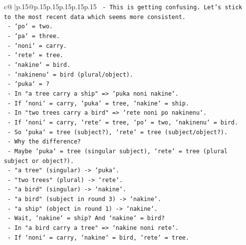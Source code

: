 \documentclass{article}
\begin{document}
{\begin{supertabular}{c@{$\;$}|p{.15\linewidth}@{}p{.15\linewidth}p{.15\linewidth}p{.15\linewidth}p{.15\linewidth}p{.15\linewidth}}
{{{\texttt{                  {-} This is getting confusing. Let's stick to the most recent data which seems more consistent.} \\
\texttt{                  {-} `po` = two.} \\
\texttt{                  {-} `pa` = three.} \\
\texttt{                  {-} `noni` = carry.} \\
\texttt{                  {-} `rete` = tree.} \\
\texttt{                  {-} `nakine` = bird.} \\
\texttt{                  {-} `nakinenu` = bird (plural/object).} \\
\texttt{                  {-} `puka` = ?} \\
\texttt{                  {-} In "a tree carry a ship" => `puka noni nakine`.} \\
\texttt{                    {-} If `noni` = carry, `puka` = tree, `nakine` = ship.} \\
\texttt{                  {-} In "two trees carry a bird" => `rete noni po nakinenu`.} \\
\texttt{                    {-} If `noni` = carry, `rete` = tree, `po` = two, `nakinenu` = bird.} \\
\texttt{                  {-} So `puka` = tree (subject?), `rete` = tree (subject/object?).} \\
\texttt{                  {-} Why the difference?} \\
\texttt{                  {-} Maybe `puka` = tree (singular subject), `rete` = tree (plural subject or object?).} \\
\texttt{                  {-} "a tree" (singular) {-}> `puka`.} \\
\texttt{                  {-} "two trees" (plural) {-}> `rete`.} \\
\texttt{                  {-} "a bird" (singular) {-}> `nakine`.} \\
\texttt{                  {-} "a bird" (subject in round 3) {-}> `nakine`.} \\
\texttt{                  {-} "a ship" (object in round 1) {-}> `nakine`.} \\
\texttt{                  {-} Wait, `nakine` = ship? And `nakine` = bird?} \\
\texttt{                  {-} In "a bird carry a tree" => `nakine noni rete`.} \\
\texttt{                    {-} If `noni` = carry, `nakine` = bird, `rete` = tree.} \\
}}}
\end{supertabular}}
\end{document}
